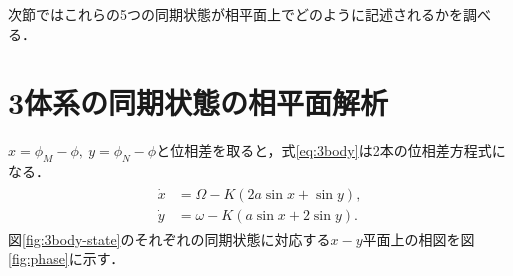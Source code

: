 \documentclass[../main]{subfiles}
\begin{document}
次節ではこれらの5つの同期状態が相平面上でどのように記述されるかを調べる．
\section{3体系の同期状態の相平面解析}
$x=\phi_M-\phi,\ y=\phi_N-\phi$と位相差を取ると，式\eqref{eq:3body}は2本の位相差方程式になる．
\begin{align}
    \label{eq:phase-diff}
    \begin{split}
    \dot{x}&=\Omega-K(2a\sin x+\sin y),\\
    \dot{y}&=\omega-K(a\sin x+2\sin y).
    \end{split}
\end{align}
図\ref{fig:3body-state}のそれぞれの同期状態に対応する$x-y$平面上の相図を図\ref{fig:phase}に示す．
\end{document}
